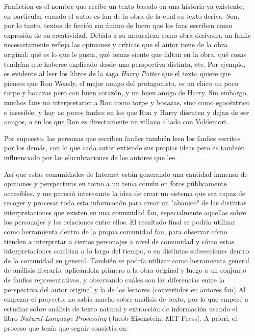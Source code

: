\documentclass{pre-tfg}
\begin{document}
Fanfiction es el nombre que recibe un texto basado en una historia ya existente, en particular cuando el autor es fan de la obra de la cual su texto deriva. Son, por lo tanto, textos de ficción sin ánimo de lucro que los fans escriben como expresión de su creatividad. Debido a su naturaleza como obra derivada, un fanfic necesariamente refleja las opiniones y críticas que el autor tiene de la obra original: qué es lo que le gusta, qué temas siente que faltan en la obra, qué cosas tendrían que haberse explicado desde una perspectiva distinta, etc.
Por ejemplo, es evidente al leer los libros de la saga \textit{Harry Potter} que el texto quiere que pienses que Ron Weasly, el mejor amigo del protagonista, es un chico un poco torpe y bocazas pero con buen corazón, y un buen amigo de Harry. Sin embargo, muchos fans no interpretaron a Ron como torpe y bocazas, sino como egocéntrico e insesible, y hay no pocos fanfics en los que Ron y Harry discuten y dejan de ser amigos, o en los que Ron es directamente un villano aliado con Voldemort.

Por supuesto, las personas que escriben fanfics también leen los fanfics escritos por los demás, con lo que cada autor extiende sus propias ideas pero es también influenciado por las elucubraciones de los autores que lee.

Así que estas comunidades de Internet están generando una cantidad inmensa de opiniones y perspectivas en torno a un tema común en foros públicamente accesibles, y me pareció interesante la idea de crear un sistema que sea capaz de recoger y procesar toda esta información para crear un "abanico" de las distintas interpretaciones que existen en una comunidad fan, especialmente aquellas sobre los personajes y las relaciones entre ellos. El resultado final se podría utilizar como herramienta dentro de la propia comunidad fan, para observar cómo tienden a interpretar a ciertos personajes a nivel de comunidad y cómo estas interpretaciones cambian a lo largo del tiempo, o en distintas subsecciones dentro de la comunidad en general. También se podría utilizar como herramienta general de análisis literario, aplicándola primero a la obra original y luego a un conjunto de fanfics representativos, y observando cuáles son las diferencias entre la perspectiva del autor original y la de los lectores (convertidos en autores fan)
Al empezar el proyecto, no sabía mucho sobre análisis de texto, por lo que empecé a estudiar sobre análisis de texto natural y extracción de información usando el libro \textit{Natural Language Processing} (Jacob Eisenstein, MIT Press). A priori, el proceso que tenía que seguir consistía en:
\end{document}
